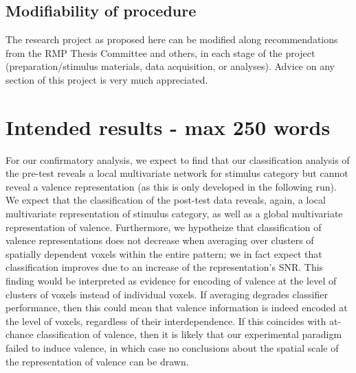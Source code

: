 \documentclass[12pt,a4paper]{article}\usepackage[]{graphicx}\usepackage[]{color}
\begin{document}
\subsection{Modifiability of procedure}
The research project as proposed here can be modified along recommendations from the RMP Thesis Committee and others, in each stage of the project (preparation/stimulus materials, data acquisition, or analyses). Advice on any section of this project is very much appreciated. \\

\noindent
\wordcount

\section{Intended results \textmd{- max 250 words}}

For our confirmatory analysis, we expect to find that our classification analysis of the pre-test reveals a local multivariate network for stimulus category but cannot reveal a valence representation (as this is only developed in the following run). We expect that the classification of the post-test data reveals, again, a local multivariate representation of stimulus category, as well as a global multivariate representation of valence. Furthermore, we hypotheize that classification of valence representations does not decrease when averaging over clusters of spatially dependent voxels within the entire pattern; we in fact expect that classification improves due to an increase of the representation's SNR. This finding would be interpreted as evidence for encoding of valence at the level of clusters of voxels instead of individual voxels. If averaging degrades classifier performance, then this could mean that valence information is indeed encoded at the level of voxels, regardless of their interdependence. If this coincides with at-chance classification of valence, then it is likely that our experimental paradigm failed to induce valence, in which case no conclusions about the spatial scale of the representation of valence can be drawn.
\end{document}
